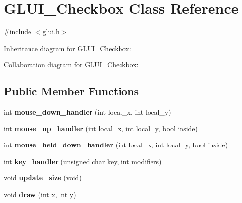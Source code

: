 \hypertarget{class_g_l_u_i___checkbox}{\section{G\+L\+U\+I\+\_\+\+Checkbox Class Reference}
\label{class_g_l_u_i___checkbox}
}


{\ttfamily \#include $<$glui.\+h$>$}



Inheritance diagram for G\+L\+U\+I\+\_\+\+Checkbox\+:


Collaboration diagram for G\+L\+U\+I\+\_\+\+Checkbox\+:
\subsection*{Public Member Functions}
\begin{DoxyCompactItemize}
\item 
\hypertarget{class_g_l_u_i___checkbox_a7cf605868f357f790890fb1eb01c4b5b}{int {\bfseries mouse\+\_\+down\+\_\+handler} (int local\+\_\+x, int local\+\_\+y)}\label{class_g_l_u_i___checkbox_a7cf605868f357f790890fb1eb01c4b5b}

\item 
\hypertarget{class_g_l_u_i___checkbox_a600720d43a3f7568c41cc23a34f7f601}{int {\bfseries mouse\+\_\+up\+\_\+handler} (int local\+\_\+x, int local\+\_\+y, bool inside)}\label{class_g_l_u_i___checkbox_a600720d43a3f7568c41cc23a34f7f601}

\item 
\hypertarget{class_g_l_u_i___checkbox_ad18f2ba9f3dc594db3f60c32bc9fe4d2}{int {\bfseries mouse\+\_\+held\+\_\+down\+\_\+handler} (int local\+\_\+x, int local\+\_\+y, bool inside)}\label{class_g_l_u_i___checkbox_ad18f2ba9f3dc594db3f60c32bc9fe4d2}

\item 
\hypertarget{class_g_l_u_i___checkbox_a246a4aea27d74689643eb4c1d5dc25ef}{int {\bfseries key\+\_\+handler} (unsigned char key, int modifiers)}\label{class_g_l_u_i___checkbox_a246a4aea27d74689643eb4c1d5dc25ef}

\item 
\hypertarget{class_g_l_u_i___checkbox_adce7c97553cc1b8b8200bf173efbffb1}{void {\bfseries update\+\_\+size} (void)}\label{class_g_l_u_i___checkbox_adce7c97553cc1b8b8200bf173efbffb1}

\item 
\hypertarget{class_g_l_u_i___checkbox_ad03530c711561d3d32348c8ee3f39b5a}{void {\bfseries draw} (int x, int \hyperlink{_ice_utils_8h_aa7ffaed69623192258fb8679569ff9ba}{y})}\label{class_g_l_u_i___checkbox_ad03530c711561d3d32348c8ee3f39b5a}


\end{DoxyCompactItemize}
